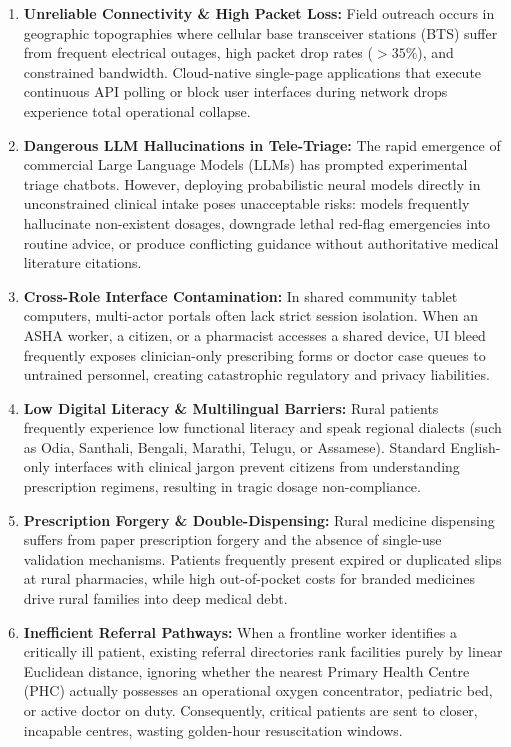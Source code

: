 \documentclass[12pt,a4paper,oneside]{report}
\begin{document}
\begin{enumerate}[label=\textbf{\arabic*.},itemsep=1pt,topsep=1pt,parsep=0pt]
    \item \textbf{Unreliable Connectivity \& High Packet Loss:} Field outreach occurs in geographic topographies where cellular base transceiver stations (BTS) suffer from frequent electrical outages, high packet drop rates ($>35\%$), and constrained bandwidth. Cloud-native single-page applications that execute continuous API polling or block user interfaces during network drops experience total operational collapse.
    \item \textbf{Dangerous LLM Hallucinations in Tele-Triage:} The rapid emergence of commercial Large Language Models (LLMs) has prompted experimental triage chatbots. However, deploying probabilistic neural models directly in unconstrained clinical intake poses unacceptable risks: models frequently hallucinate non-existent dosages, downgrade lethal red-flag emergencies into routine advice, or produce conflicting guidance without authoritative medical literature citations.
    \item \textbf{Cross-Role Interface Contamination:} In shared community tablet computers, multi-actor portals often lack strict session isolation. When an ASHA worker, a citizen, or a pharmacist accesses a shared device, UI bleed frequently exposes clinician-only prescribing forms or doctor case queues to untrained personnel, creating catastrophic regulatory and privacy liabilities.
    \item \textbf{Low Digital Literacy \& Multilingual Barriers:} Rural patients frequently experience low functional literacy and speak regional dialects (such as Odia, Santhali, Bengali, Marathi, Telugu, or Assamese). Standard English-only interfaces with clinical jargon prevent citizens from understanding prescription regimens, resulting in tragic dosage non-compliance.
    \item \textbf{Prescription Forgery \& Double-Dispensing:} Rural medicine dispensing suffers from paper prescription forgery and the absence of single-use validation mechanisms. Patients frequently present expired or duplicated slips at rural pharmacies, while high out-of-pocket costs for branded medicines drive rural families into deep medical debt.
    \item \textbf{Inefficient Referral Pathways:} When a frontline worker identifies a critically ill patient, existing referral directories rank facilities purely by linear Euclidean distance, ignoring whether the nearest Primary Health Centre (PHC) actually possesses an operational oxygen concentrator, pediatric bed, or active doctor on duty. Consequently, critical patients are sent to closer, incapable centres, wasting golden-hour resuscitation windows.
\end{enumerate}
\end{document}

